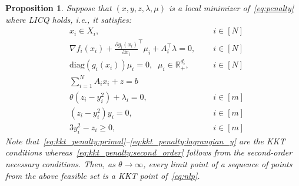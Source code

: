 \documentclass[11pt]{article}
\newtheorem{prop}{Proposition}
\begin{document}
\begin{prop}
    Suppose that $(x, y, z, \lambda, \mu)$ is a local minimizer of~\eqref{eq:penalty} where LICQ holds, i.e., it satisfies:
    \begin{subequations}\label{eq:kkt_penalty}
        \begin{align}
        & x_i \in X_i, \;\; && i \in [N] \label{eq:kkt_penalty:primal}\\
        & \nabla f_i(x_i) + \frac{\partial g_i(x_i)}{\partial x_i}^\top \mu_i + A_i^\top \lambda = 0, \;\; && i \in [N]\label{eq:kkt_penalty:lagrangian_x} \\
        & \mathrm{diag}(g_i(x_i)) \mu_i = 0, \;\;\mu_i \in \mathbb{R}^{d_i}_{+}, \;\; && i \in [N]\label{eq:kkt_penalty:complementarity} \\
        & \sum_{i = 1}^N A_i x_i + z = b \label{eq:kkt_penalty:coupling_primal}\\
        & \theta (z_i - y_i^2) + \lambda_i = 0, \;\; && i \in [m] \label{eq:kkt_penalty:lagrangian_z} \\
        & (z_i - y_i^2) y_i = 0, \;\; && i \in [m]  \label{eq:kkt_penalty:lagrangian_y} \\
        & 3y_i^2 - z_i \geq 0, \;\; && i \in [m] \label{eq:kkt_penalty:second_order}
        \end{align}
    \end{subequations}
    Note that~\eqref{eq:kkt_penalty:primal}--\eqref{eq:kkt_penalty:lagrangian_y} are the KKT conditions whereas~\eqref{eq:kkt_penalty:second_order} follows from the second-order necessary conditions.
    Then, as $\theta \to \infty$, every limit point of a sequence of points from the above feasible set is a KKT point of~\eqref{eq:nlp}.
\end{prop}
\end{document}
